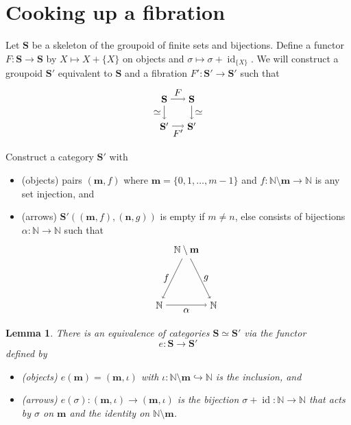 \documentclass[11pt]{amsart}
\newcommand{\NN}{\mathbb{N}}
\newcommand{\cat}[1]{\mathbf{#1}}
\newcommand{\from}{\colon}
\DeclareMathOperator{\id}{id}
\newtheorem{lem}[thm]{Lemma}
\theoremstyle{remark}
\theoremstyle{definition}
\begin{document}
	

%
\section{Cooking up a fibration} %
\label{sec.Cooking}
%
Let $\cat{S}$ be a skeleton of the groupoid of finite sets and bijections.  Define a functor $F \from \cat{S} \to \cat{S}$ by $X \mapsto X + \{X\}$ on objects and $\sigma \mapsto \sigma + \id_{\{X\}}$.  We will construct a groupoid $\cat{S}'$ equivalent to $\cat{S}$ and a fibration $F' \from \cat{S}' \to \cat{S}'$ such that
\begin{equation}
\label{eq:sub F' for F}
\raisebox{-0.75\height}{
\begin{tikzpicture}
	\node (1) at (-0.5,1) {$\cat{S}$};
	\node (2) at (-0.5,0) {$\cat{S}'$};
	\node (3) at (0.5,0) {$\cat{S}'$};
	\node (4) at (0.5,1) {$\cat{S}$};
	\draw [->] (1) to node[left] {$\simeq$} (2);
	\draw [->] (2) to node[below] {$F'$} (3);
	\draw [->] (1) to node[above] {$F$} (4);
	\draw [->] (4) to node[right] {$\simeq$} (3);
\end{tikzpicture} 
}
\end{equation}

Construct a category $\cat{S}'$ with
\begin{itemize}
	\item (objects) pairs $(\mathbf{m},f)$ where $\mathbf{m}=\{0,1,\dotsc,m-1\}$ and $f \from \NN \setminus \mathbf{m} \to \NN$ is any set injection, and
	\item (arrows) $\cat{S}'((\mathbf{m},f),(\mathbf{n},g))$ is empty if $m \neq n$, else consists of bijections $\alpha \from \NN \to \NN$ such that
	\[
	\begin{tikzpicture}
		\node (1) at (0,2) {$\NN \setminus \mathbf{m}$};
		\node (2) at (-1,0) {$\NN$};
		\node (3) at (1,0) {$\NN$};
		\draw [->] (1) to node[left] {$f$} (2);
		\draw [->] (1) to node[right] {$g$} (3);
		\draw [->] (2) to node[below] {$\alpha$} (3);
	\end{tikzpicture}
	\]
\end{itemize}

\begin{lem}
	There is an equivalence of categories $\cat{S} \simeq \cat{S}'$ via the functor 
	\[
		e \from \cat{S} \to \cat{S}'
	\] 
	defined by 
	\begin{itemize}
		\item (objects) $e(\mathbf{m}) = (\mathbf{m},\iota)$ with $\iota \from \NN \setminus \mathbf{m} \hookrightarrow \NN$ is the inclusion, and
		\item (arrows) $e(\sigma) \from (\mathbf{m},\iota) \to (\mathbf{m},\iota)$ is the bijection $\sigma + \id \from \NN \to \NN$ that acts by $\sigma$ on $\mathbf{m}$ and the identity on $\NN \setminus \mathbf{m}$.
	\end{itemize}
\end{lem}
\end{document}
